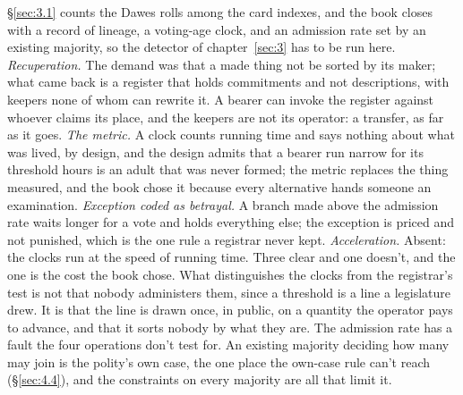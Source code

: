 \S\ref{sec:3.1} counts the Dawes rolls among the card indexes, and the book closes with a record of lineage, a voting-age clock, and an admission rate set by an existing majority, so the detector of chapter~\ref{sec:3} has to be run here. \emph{Recuperation.} The demand was that a made thing not be sorted by its maker; what came back is a register that holds commitments and not descriptions, with keepers none of whom can rewrite it. A bearer can invoke the register against whoever claims its place, and the keepers are not its operator: a transfer, as far as it goes. \emph{The metric.} A clock counts running time and says nothing about what was lived, by design, and the design admits that a bearer run narrow for its threshold hours is an adult that was never formed; the metric replaces the thing measured, and the book chose it because every alternative hands someone an examination. \emph{Exception coded as betrayal.} A branch made above the admission rate waits longer for a vote and holds everything else; the exception is priced and not punished, which is the one rule a registrar never kept. \emph{Acceleration.} Absent: the clocks run at the speed of running time. Three clear and one doesn't, and the one is the cost the book chose. What distinguishes the clocks from the registrar's test is not that nobody administers them, since a threshold is a line a legislature drew. It is that the line is drawn once, in public, on a quantity the operator pays to advance, and that it sorts nobody by what they are. The admission rate has a fault the four operations don't test for. An existing majority deciding how many may join is the polity's own case, the one place the own-case rule can't reach (\S\ref{sec:4.4}), and the constraints on every majority are all that limit it.


